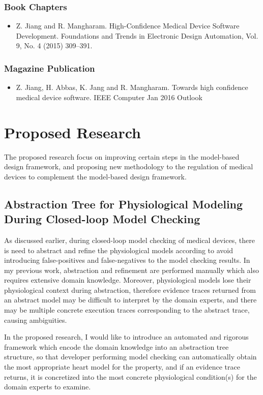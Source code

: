 \documentclass[a4paper]{article}
\begin{document}
\subsubsection{Book Chapters}
\begin{itemize}
\item Z. Jiang and R. Mangharam. High-Confidence Medical Device Software
Development. Foundations and Trends in Electronic Design Automation, Vol. 9, No. 4 (2015) 309–391.
\end{itemize}
\subsubsection{Magazine Publication}
\begin{itemize}
\item Z. Jiang, H. Abbas, K. Jang and R. Mangharam. Towards high confidence medical device software. IEEE Computer Jan 2016 Outlook
\end{itemize}

\newpage

\section{Proposed Research}
The proposed research focus on improving certain steps in the model-based design framework, and proposing new methodology to the regulation of medical devices to complement the model-based design framework.
\subsection{Abstraction Tree for Physiological Modeling During Closed-loop Model Checking}
As discussed earlier, during closed-loop model checking of medical devices, there is need to abstract and refine the physiological models according to avoid introducing false-positives and false-negatives to the model checking results.
In my previous work, abstraction and refinement are performed manually which also requires extensive domain knowledge.
Moreover, physiological models lose their physiological context during abstraction, therefore evidence traces returned from an abstract model may be difficult to interpret by the domain experts, and there may be multiple concrete execution traces corresponding to the abstract trace, causing ambiguities.

In the proposed research, I would like to introduce an automated and rigorous framework which encode the domain knowledge into an abstraction tree structure, so that developer performing model checking can automatically obtain the most appropriate heart model for the property, and if an evidence trace returns, it is concretized into the most concrete physiological condition(s) for the domain experts to examine.
\end{document}

